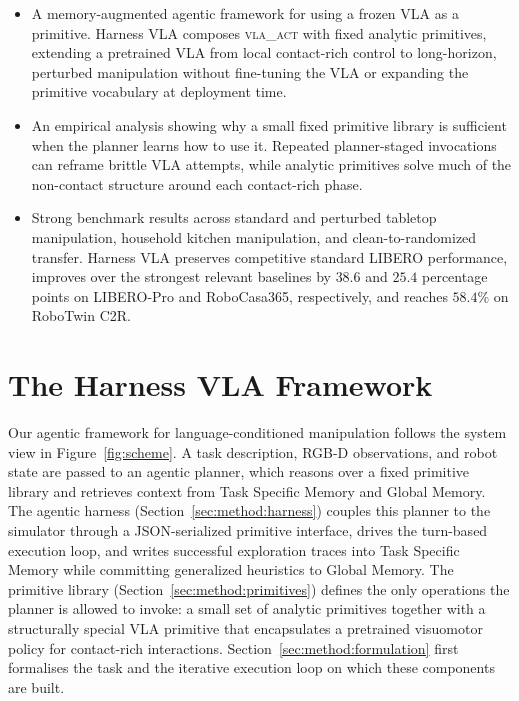 \documentclass[11pt]{article}
\begin{document}
\begin{itemize}
    \item A memory-augmented agentic framework for using a frozen VLA as a primitive. Harness VLA composes \textsc{vla\_act} with fixed analytic primitives, extending a pretrained VLA from local contact-rich control to long-horizon, perturbed manipulation without fine-tuning the VLA or expanding the primitive vocabulary at deployment time.
    \item An empirical analysis showing why a small fixed primitive library is sufficient when the planner learns how to use it. Repeated planner-staged invocations can reframe brittle VLA attempts, while analytic primitives solve much of the non-contact structure around each contact-rich phase.
    \item Strong benchmark results across standard and perturbed tabletop manipulation, household kitchen manipulation, and clean-to-randomized transfer. Harness VLA preserves competitive standard LIBERO performance, improves over the strongest relevant baselines by $38.6$ and $25.4$ percentage points on LIBERO-Pro and RoboCasa365, respectively, and reaches $58.4\%$ on RoboTwin C2R.
\end{itemize}

\section{The Harness VLA Framework}
\label{sec:method}

	Our agentic framework for language-conditioned manipulation follows the system view in Figure~\ref{fig:scheme}. A task description, RGB-D observations, and robot state are passed to an agentic planner, which reasons over a fixed primitive library and retrieves context from Task Specific Memory and Global Memory. The agentic harness (Section~\ref{sec:method:harness}) couples this planner to the simulator through a JSON-serialized primitive interface, drives the turn-based execution loop, and writes successful exploration traces into Task Specific Memory while committing generalized heuristics to Global Memory. The primitive library (Section~\ref{sec:method:primitives}) defines the only operations the planner is allowed to invoke: a small set of analytic primitives together with a structurally special VLA primitive that encapsulates a pretrained visuomotor policy for contact-rich interactions. Section~\ref{sec:method:formulation} first formalises the task and the iterative execution loop on which these components are built.
\end{document}
